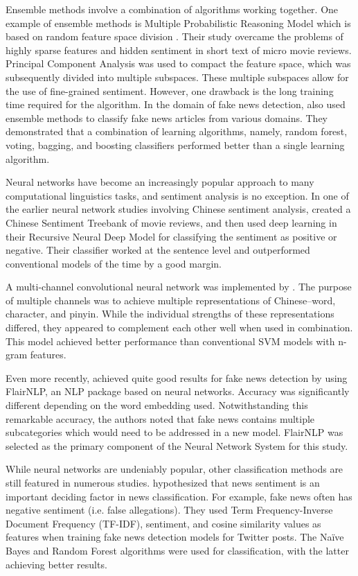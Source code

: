 \documentclass [11pt, proquest] {uwthesis}[2020/02/24]
\begin{document}
Ensemble methods involve a combination of algorithms working together. One example of ensemble methods is Multiple Probabilistic Reasoning Model which is based on random feature space division \citep{Xu2013}. Their study overcame the problems of highly sparse features and hidden sentiment in short text of micro movie reviews. Principal Component Analysis was used to compact the feature space, which was subsequently divided into multiple subspaces. These multiple subspaces allow for the use of fine-grained sentiment. However, one drawback is the long training time required for the algorithm. In the domain of fake news detection, \cite{Ahmad2021} also used ensemble methods to classify fake news articles from various domains. They demonstrated that a combination of learning algorithms, namely, random forest, voting, bagging, and boosting classifiers performed better than a single learning algorithm. 

Neural networks have become an increasingly popular approach to many computational linguistics tasks, and sentiment analysis is no exception. In one of the earlier neural network studies involving Chinese sentiment analysis, \cite{Li2014} created a Chinese Sentiment Treebank of movie reviews, and then used deep learning in their Recursive Neural Deep Model for classifying the sentiment as positive or negative. Their classifier worked at the sentence level and outperformed conventional models of the time by a good margin. 

A multi-channel convolutional neural network was implemented by \cite{Liu2018}. The purpose of multiple channels was to achieve multiple representations of Chinese--word, character, and pinyin. While the individual strengths of these representations differed, they appeared to complement each other well when used in combination. This model achieved better performance than conventional SVM models with n-gram features. 

Even more recently, \cite{Kula2020} achieved quite good results for fake news detection by using FlairNLP, an NLP package based on neural networks. Accuracy was significantly different depending on the word embedding used. Notwithstanding this remarkable accuracy, the authors noted that fake news contains multiple subcategories which would need to be addressed in a new model. FlairNLP was selected as the primary component of the Neural Network System for this study.

While neural networks are undeniably popular, other classification methods are still featured in numerous studies. \cite{Bhutani2019} hypothesized that news sentiment is an important deciding factor in news classification. For example, fake news often has negative sentiment (i.e. false allegations). They used Term Frequency-Inverse Document Frequency (TF-IDF), sentiment, and cosine similarity values as features when training fake news detection models for Twitter posts. The Naïve Bayes and Random Forest algorithms were used for classification, with the latter achieving better results. 
\end{document}
